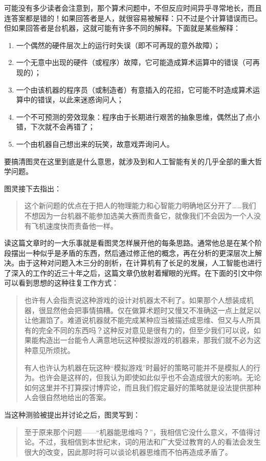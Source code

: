 可能没有多少读者会注意到，那个算术问题中，不但反应时间异乎寻常地长，而且连答案都是错的！如果回答者是人，就很容易被解释：只不过是个计算错误而已。但如果回答者是台机器，这就可能有许多不同的解释。下面就是某些解释：
\begin{enumerate}
\item 一个偶然的硬件层次上的运行时失误（即不可再现的意外故障）；
\item 一个无意中出现的硬件（或程序）故障，它可能造成算术运算中的错误（可再现的）；
\item 一个由该机器的程序员（或制造者）有意插入的花招，它可能不时造成算术运算中的错误，以此来迷惑询问人；
\item 一个不可预测的旁效现象：程序由于长期进行艰苦的抽象思维，偶然出了点小错，下次就不会再错了；
\item 一个由机器自己想出来的玩笑，故意戏弄询问人。
\end{enumerate}
要搞清图灵在这里到底是什么意思，就涉及到和人工智能有关的几乎全部的重大哲学问题。

图灵接下去指出：
\begin{quote}
这个新问题的优点在于把人的物理能力和心智能力明确地区分开了……我们不想因为一台机器不能参加选美大赛而责备它，就像我们不会因为一个人没有飞机速度快而责备他一样。
\end{quote}
读这篇文章时的一大乐事就是看图灵怎样展开他的每条思路。通常他总是在某个阶段摆出一种似乎是矛盾的东西，然后通过修正他的概念，再在分析的更深层次上解决。由于这种对问题入木三分的剖析，在计算机有了长足的发展，人工智能也进行了深入的工作的近三十年之后，这篇文章仍放射着耀眼的光辉。在下面的引文中你可以看到思想的这种往复工作方式：
\begin{quote}
也许有人会指责说这种游戏的设计对机器太不利了。如果那个人想装成机器，很显然他会把事情搞糟。仅在做算术题时又慢又不准确这一点上就足以让他漏馅了。难道说机器就不能完成某种应当被描述成思维、但又与人所具有的完全不同的东西吗？这种反对意见是很有力的，但至少我们可以说，如果能构造出一台能令人满意地玩这种模拟游戏的机器来，那我们就不必为这种意见所烦扰。

有人也许认为机器在玩这种“模拟游戏”时最好的策略可能并不是模拟人的行为。也许会是这样的，但我认为即使如此似乎也不会造成很大的影响。无论如何这里并不打算探讨博弈论，而且我们假定最好的策略就是设法提供那种人会很自然地给出的答案。
\end{quote}
当这种测验被提出并讨论之后，图灵写到：
\begin{quote}
至于原来那个问题——“机器能思维吗？”，我相信它没什么意义，不值得讨论。不过，我相信到本世纪末，词的用法和广大受过教育的人的看法会发生很大的改变，因此那时将可以谈论机器思维而不怕再造成矛盾了。
\end{quote}


